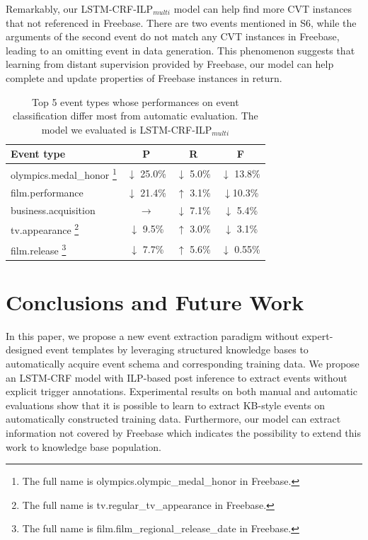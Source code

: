 \documentclass{article}
\begin{document}
Remarkably, our LSTM-CRF-ILP$_{multi}$ model can help find more CVT instances that not referenced in Freebase. There are two events mentioned in S6, while the arguments of the second event do not match any CVT instances in Freebase, leading to an omitting event in data generation. This phenomenon suggests that learning from distant supervision provided by Freebase, our model can help complete and update properties of Freebase instances in return.

\begin{table}[h]
\small
\centering
\begin{tabular}{|l|c|c|c|} \hline
	Event type & P & R & F \\ \hline
	olympics.medal\_honor 
	 \footnote{The full name is olympics.olympic\_medal\_honor in Freebase.} 
	& $\downarrow$ 25.0\% & $\downarrow$ 5.0\% & $\downarrow$ 13.8\% \\ \hline
	film.performance & $\downarrow$ 21.4\% & $\uparrow$ 3.1\% & $\downarrow$10.3\% \\ \hline
	business.acquisition & $\rightarrow$ & $\downarrow$ 7.1\% & $\downarrow$ 5.4\% \\ \hline
	tv.appearance 
	 \footnote{The full name is tv.regular\_tv\_appearance in Freebase.} 
	& $\downarrow$ 9.5\% & $\uparrow$ 3.0\% & $\downarrow$ 3.1\% \\ \hline
	film.release 
	 \footnote{The full name is film.film\_regional\_release\_date in Freebase.} 
	& $\downarrow$ 7.7\% & $\uparrow$ 5.6\% & $\downarrow$ 0.55\% \\ \hline
\end{tabular}
\caption{Top 5 event types whose performances on event classification differ most from automatic evaluation. The model we evaluated is LSTM-CRF-ILP$_{multi}$ \label{tab:4}}
\end{table}



\section{Conclusions and Future Work}
In this paper, we propose a new event extraction paradigm without expert-designed event templates by leveraging structured knowledge bases to automatically acquire event schema and corresponding training data. We propose an LSTM-CRF model with ILP-based post inference to extract events without explicit trigger annotations. Experimental results on both manual and automatic evaluations show that it is possible to learn to extract KB-style events on automatically constructed training data.
Furthermore, our model can extract information not covered by Freebase which indicates the possibility to extend this work to knowledge base population. 




\end{document}
